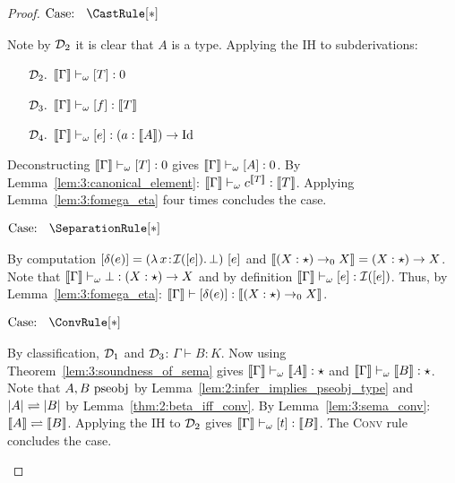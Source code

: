 \begin{proof}
    $\text{Case: }\begin{array}{c} \CastRule[*] \end{array}$
    \begin{proofcase}
        Note by $\mathcal{D}_{2}$ it is clear that $A$ is a type.
        Applying the IH to subderivations:
        \begin{enumerate}
            \item[$\mathcal{D}_{2}.$] $\llbracket \Gamma \rrbracket \vdash_\omega [T] : 0$
            \item[$\mathcal{D}_{3}.$] $\llbracket \Gamma \rrbracket \vdash_\omega [f] : \llbracket T \rrbracket$
            \item[$\mathcal{D}_{4}.$] $\llbracket \Gamma \rrbracket \vdash_\omega [e] : (a : \llbracket A \rrbracket) \to \text{Id}$
        \end{enumerate}
        Deconstructing $\llbracket \Gamma \rrbracket \vdash_\omega [T] : 0$ gives $\llbracket \Gamma \rrbracket \vdash_\omega [A] : 0$.
        By Lemma~\ref{lem:3:canonical_element}: $\llbracket \Gamma \rrbracket \vdash_\omega c^{\llbracket T \rrbracket} : \llbracket T \rrbracket$.
        Applying Lemma~\ref{lem:3:fomega_eta} four times concludes the case.
    \end{proofcase}

    $\text{Case: }\begin{array}{c} \SeparationRule[*] \end{array}$
    \begin{proofcase}
        By computation $[\delta(e)] = ({\lambda}\, x\! : \! \mathcal{I}([e]).\, \bot)\ [e]$ and $\llbracket (X : \star) \to_0 X \rrbracket = (X : \star) \to X$.
        Note that $\llbracket \Gamma \rrbracket \vdash_\omega \bot : (X : \star) \to X$ and by definition $\llbracket \Gamma \rrbracket \vdash_\omega [e] : \mathcal{I}([e])$.
        Thus, by Lemma~\ref{lem:3:fomega_eta}: $\llbracket \Gamma \rrbracket \vdash [\delta(e)] : \llbracket (X : \star) \to_0 X \rrbracket$.
    \end{proofcase}

    $\text{Case: }\begin{array}{c} \ConvRule[*] \end{array}$
    \begin{proofcase}
        By classification, $\mathcal{D}_{1}$ and $\mathcal{D}_{3}$: $\Gamma \vdash B : K$.
        Now using Theorem~\ref{lem:3:soundness_of_sema} gives $\llbracket \Gamma \rrbracket \vdash_\omega \llbracket A \rrbracket : \star$ and $\llbracket \Gamma \rrbracket \vdash_\omega \llbracket B \rrbracket : \star$.
        Note that $A,B~\textnormal{pseobj}$ by Lemma~\ref{lem:2:infer_implies_pseobj_type} and $|A| \rightleftharpoons |B|$ by Lemma~\ref{thm:2:beta_iff_conv}.
        By Lemma~\ref{lem:3:sema_conv}: $\llbracket A \rrbracket \rightleftharpoons \llbracket B \rrbracket$.
        Applying the IH to $\mathcal{D}_{2}$ gives $\llbracket \Gamma \rrbracket \vdash_\omega [t] : \llbracket B \rrbracket$.
        The \textsc{Conv} rule concludes the case.
    \end{proofcase}
\end{proof}

